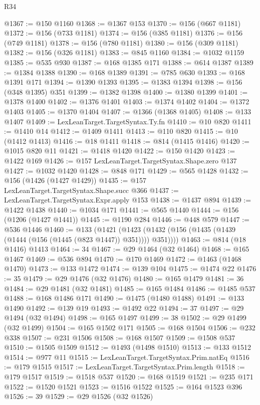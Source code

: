 \begin{lexlean}{R34}
\begin{coremodule}
@1367 := @150 @1160
@1368 := @1367 @153
@1370 := @156 (@667 @1181)
@1372 := @156 (@733 @1181)
@1374 := @156 (@385 @1181)
@1376 := @156 (@749 @1181)
@1378 := @156 (@780 @1181)
@1380 := @156 (@309 @1181)
@1382 := @156 (@326 @1181)
@1383 := @845 @1160
@1384 := @1032 @1159
@1385 := @535 @930
@1387 := @168 @1385 @171
@1388 := @614 @1387
@1389 := @1384 @1388
@1390 := @168 @1389
@1391 := @785 @630
@1393 := @168 @1391 @171
@1394 := @1390 @1393
@1395 := @1383 @1394
@1398 := @156 (@348 @1395) @351
@1399 := @1382 @1398
@1400 := @1380 @1399
@1401 := @1378 @1400
@1402 := @1376 @1401
@1403 := @1374 @1402
@1404 := @1372 @1403
@1405 := @1370 @1404
@1407 := @1366 (@1368 @1405)
@1408 := @133 @1407
@1409 := LexLeanTarget.TargetSyntax.Ty.fn
@1410 := @10 @820
@1411 := @1410 @14
@1412 := @1409 @1411
@1413 := @110 @820
@1415 := @10 (@1412 @1413)
@1416 := @18 @1411
@1418 := @814 (@1415 @1416)
@1420 := @1015 @820 @11
@1421 := @1418 @1420
@1422 := @150 @1420
@1423 := @1422 @169
@1426 := @157 LexLeanTarget.TargetSyntax.Shape.zero @137
@1427 := @1032 @1420
@1428 := @848 @171
@1429 := @565 @1428
@1432 := @156 (@1426 (@1427 @1429))
@1435 := @157 LexLeanTarget.TargetSyntax.Shape.succ @366
@1437 := LexLeanTarget.TargetSyntax.Expr.apply @153
@1438 := @1437 @894
@1439 := @1422 @1438
@1440 := @1034 @171
@1441 := @565 @1440
@1444 := @156 (@1206 (@1427 @1441))
@1445 := @1190 @284
@1446 := @448 @579
@1447 := @536 @1446
@1460 := @133
    (@1421 (@1423 (@1432 (@156 (@1435 (@1439 (@1444 (@156 (@1445 (@823 @1447)) @351)))) @351))))
@1463 := @814 (@18 @1416) @1413
@1464 := 34
@1467 := @29 @1464 (@32 @1464)
@1468 := @165 @1467
@1469 := @536 @894
@1470 := @170 @1469
@1472 := @1463 (@1468 @1470)
@1473 := @133 @1472
@1474 := @139 @104
@1475 := @1474 @22
@1476 := 35
@1479 := @29 @1476 (@32 @1476)
@1480 := @165 @1479
@1481 := 36
@1484 := @29 @1481 (@32 @1481)
@1485 := @165 @1484
@1486 := @1485 @537
@1488 := @168 @1486 @171
@1490 := @1475 (@1480 @1488)
@1491 := @133 @1490
@1492 := @139 @19
@1493 := @1492 @22
@1494 := 37
@1497 := @29 @1494 (@32 @1494)
@1498 := @165 @1497
@1499 := 38
@1502 := @29 @1499 (@32 @1499)
@1504 := @165 @1502 @171
@1505 := @168 @1504
@1506 := @232 @338
@1507 := @231 @1506
@1508 := @168 @1507
@1509 := @1508 @537
@1510 := @1505 @1509
@1512 := @1493 (@1498 @1510)
@1513 := @133 @1512
@1514 := @977 @11
@1515 := LexLeanTarget.TargetSyntax.Prim.natEq
@1516 := @179 @1515
@1517 := LexLeanTarget.TargetSyntax.Prim.length
@1518 := @179 @1517
@1519 := @1518 @537
@1520 := @168 @1519
@1521 := @235 @171
@1522 := @1520 @1521
@1523 := @1516 @1522
@1525 := @164 @1523 @396
@1526 := 39
@1529 := @29 @1526 (@32 @1526)

\end{coremodule}
\end{lexlean}
